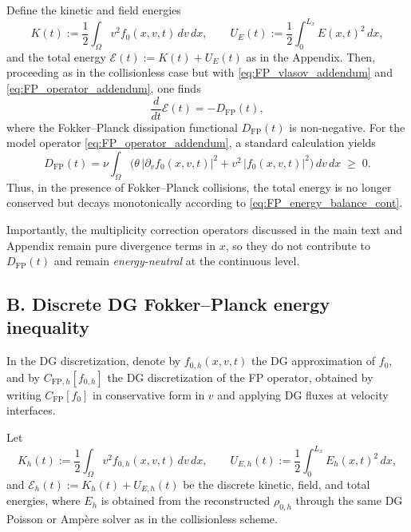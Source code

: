 \documentclass[11pt]{article}
\begin{document}
Define the kinetic and field energies
\[
  K(t) := \frac12\int_{\Omega} v^2 f_0(x,v,t)\,dv\,dx,
  \qquad
  U_E(t) := \frac12\int_0^{L_x} E(x,t)^2\,dx,
\]
and the total energy $\mathcal{E}(t) := K(t)+U_E(t)$ as in the Appendix. Then,
proceeding as in the collisionless case but with \eqref{eq:FP_vlasov_addendum}
and \eqref{eq:FP_operator_addendum}, one finds
\begin{equation}
  \frac{d}{dt}\mathcal{E}(t)
  = -D_{\mathrm{FP}}(t),
  \label{eq:FP_energy_balance_cont}
\end{equation}
where the Fokker--Planck dissipation functional $D_{\mathrm{FP}}(t)$ is
non-negative. For the model operator \eqref{eq:FP_operator_addendum}, a
standard calculation yields
\begin{equation}
  D_{\mathrm{FP}}(t)
  =
  \nu \int_{\Omega}
    \Big(
      \theta\,|\partial_v f_0(x,v,t)|^2
      + v^2\,|f_0(x,v,t)|^2
    \Big)\,dv\,dx
  \;\ge\; 0.
  \label{eq:FP_dissipation_cont}
\end{equation}
Thus, in the presence of Fokker--Planck collisions, the total energy is no
longer conserved but decays monotonically according to
\eqref{eq:FP_energy_balance_cont}.

Importantly, the multiplicity correction operators discussed in the main text
and Appendix remain pure divergence terms in $x$, so they do not contribute to
$D_{\mathrm{FP}}(t)$ and remain \emph{energy-neutral} at the continuous level.

\subsection*{B. Discrete DG Fokker--Planck energy inequality}

In the DG discretization, denote by $f_{0,h}(x,v,t)$ the DG approximation of
$f_0$, and by $C_{\mathrm{FP},h}[f_{0,h}]$ the DG discretization of the FP
operator, obtained by writing $C_{\mathrm{FP}}[f_0]$ in conservative form in
$v$ and applying DG fluxes at velocity interfaces.

Let
\[
  K_h(t) := \frac12\int_{\Omega} v^2 f_{0,h}(x,v,t)\,dv\,dx,
  \qquad
  U_{E,h}(t) := \frac12\int_0^{L_x} E_h(x,t)^2\,dx,
\]
and $\mathcal{E}_h(t) := K_h(t)+U_{E,h}(t)$ be the discrete kinetic, field,
and total energies, where $E_h$ is obtained from the reconstructed $\rho_{0,h}$
through the same DG Poisson or Amp\`ere solver as in the collisionless scheme.
\end{document}
